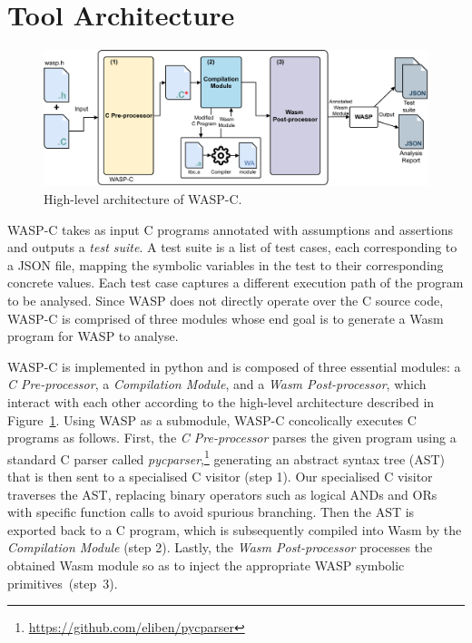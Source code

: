 \section{Tool Architecture}

\begin{figure}[t!]
  \centering
  \includegraphics[width=0.9\linewidth]{graphics/wasp-c}
  \caption{High-level architecture of WASP-C.}%
  \label{fig:arch}
\end{figure}

WASP-C takes as input C programs annotated with assumptions and assertions and outputs a \textit{test suite}. A test suite is a list of test cases, each corresponding to a JSON file, mapping the symbolic variables in the test to their corresponding concrete values. Each test case captures a different execution path of the program to be analysed. Since WASP does not directly operate over the C source code, WASP-C is comprised of three modules whose end goal is to generate a Wasm program for WASP to analyse.

WASP-C is implemented in python and is composed of three essential modules: a \textit{C Pre-processor}, a \textit{Compilation Module}, and a \textit{Wasm Post-processor}, which interact with each other according to the high-level architecture described in Figure~\ref{fig:arch}.
Using WASP as a submodule, WASP-C concolically executes C programs as follows.
First, the \textit{C Pre-processor} parses the given program using a standard C parser called \textit{pycparser},\footnote{\url{https://github.com/eliben/pycparser}} generating an abstract syntax tree (AST) that is then sent to a specialised C visitor (step 1). Our specialised C visitor traverses the AST, replacing binary operators such as logical ANDs and ORs with specific function calls to avoid spurious branching. Then the AST is exported back to a C program, which is subsequently compiled into Wasm by the \textit{Compilation Module} (step 2). Lastly, the \textit{Wasm Post-processor} processes the obtained Wasm module so as to inject the appropriate WASP symbolic primitives~(step~3).


